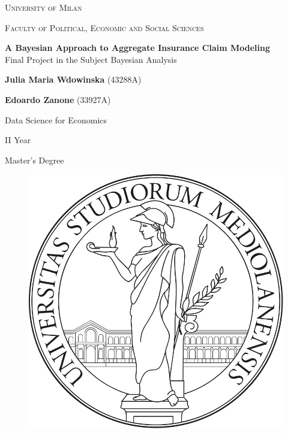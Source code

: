 \documentclass{Class/julia}
\date{} %
\begin{document}
\begin{titlepage}
    \centering
    \vfill
    {\scshape\Large University of Milan \par}
    \vspace{0.5cm}
    {\scshape\large Faculty of Political, Economic and Social Sciences \par}
    \vspace{3cm}
    {\huge
    \textbf{A Bayesian Approach to Aggregate Insurance Claim Modeling} \\
    \vspace{0.5cm}
    \large Final Project in the Subject Bayesian Analysis \par}
    \vspace{2cm}
    {\large \textbf{Julia Maria Wdowinska} (43288A) \par}
    {\large \textbf{Edoardo Zanone} (33927A) \par}
    \vspace{0.5cm}
    {\large Data Science for Economics \par}
    {\large II Year \par}
    {\large Master’s Degree \par}
    \vfill
\begin{center}
\begin{figure}[h!]\centering
 \includegraphics[keepaspectratio=true,scale=0.2]{logo} \\

\end{figure}
\end{center}
\end{titlepage}
\end{document}
